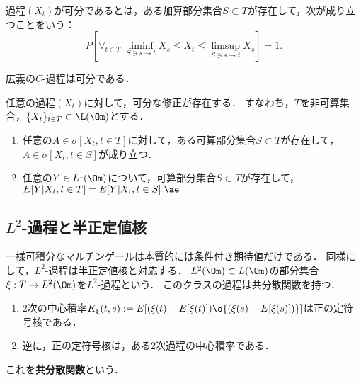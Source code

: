 \documentclass[uplatex,dvipdfmx]{jsreport}
\begin{document}
\begin{definition}[separability]
    過程$(X_t)$が可分であるとは，ある加算部分集合$S\subset T$が存在して，次が成り立つことをいう：
    \[P[\forall_{t\in T}\;\liminf_{S\ni s\to t}X_s\le X_t\le\limsup_{S\ni s\to t}X_s]=1.\]
\end{definition}

\begin{lemma}
    広義の$C$-過程は可分である．
\end{lemma}

\begin{theorem}\label{thm-Doob-separable-theorem}
    任意の過程$(X_t)$に対して，可分な修正が存在する．
    すなわち，$T$を非可算集合，$\{X_t\}_{t\in T}\subset\L(\Om)$とする．
    \begin{enumerate}
        \item 任意の$A\in\sigma[X_t,t\in T]$に対して，ある可算部分集合$S\subset T$が存在して，$A\in\sigma[X_t,t\in S]$が成り立つ．
        \item 任意の$Y\in L^1(\Om)$について，可算部分集合$S\subset T$が存在して，$E[Y|X_t,t\in T]=E[Y|X_t,t\in S]\;\ae$
    \end{enumerate}
\end{theorem}

\subsection{$L^2$-過程と半正定値核}

\begin{tcolorbox}[colframe=ForestGreen, colback=ForestGreen!10!white,breakable,colbacktitle=ForestGreen!40!white,coltitle=black,fonttitle=\bfseries\sffamily,
title=]
    一様可積分なマルチンゲールは本質的には条件付き期待値だけである．
    同様にして，$L^2$-過程は半正定値核と対応する．
    $L^2(\Om)\subset L(\Om)$の部分集合$\xi:T\to L^2(\Om)$を$L^2$-過程という．
    このクラスの過程は共分散関数を持つ．
\end{tcolorbox}

\begin{proposition}[半正定値核と一対一対応する]\mbox{}
    \begin{enumerate}
        \item 2次の中心積率$K_\xi(t,s):=E[(\xi(t)-E[\xi(t)])\o{(\xi(s)-E[\xi(s)])}]$は正の定符号核である．
        \item 逆に，正の定符号核は，ある2次過程の中心積率である．
    \end{enumerate}
    これを\textbf{共分散関数}という．
\end{proposition}
\end{document}
